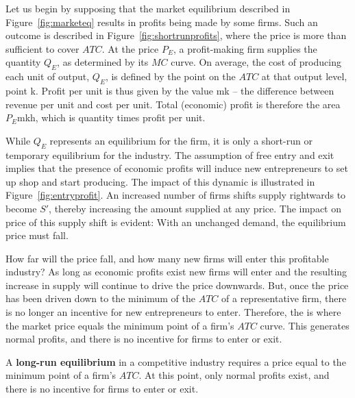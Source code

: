 Let us begin by supposing that the market equilibrium described in Figure~\ref{fig:marketeq} results in profits being made by some firms. Such an outcome is described in Figure~\ref{fig:shortrunprofits}, where the price is more than sufficient to cover $ATC$. At the price $P_E$, a profit-making firm supplies the quantity $Q_E$, as determined by its $MC$ curve. On average, the cost of producing each unit of output, $Q_E$, is defined by the point on the $ATC$ at that output level, point k. Profit per unit is thus given by the value mk -- the difference between revenue per unit and cost per unit. Total (economic) profit is therefore the area $P_E$mkh, which is quantity times profit per unit.



While $Q_E$ represents an equilibrium for the firm, it is only a short-run or temporary equilibrium for the industry. The assumption of free entry and exit implies that the presence of economic profits will induce new entrepreneurs to set up shop and start producing. The impact of this dynamic is illustrated in Figure~\ref{fig:entryprofit}. An increased number of firms shifts supply rightwards to become $S'$, thereby increasing the amount supplied at any price. The impact on price of this supply shift is evident: With an unchanged demand, the equilibrium price must fall.



How far will the price fall, and how many new firms will enter this profitable industry? As long as economic profits exist new firms will enter and the resulting increase in supply will continue to drive the price downwards. But, once the price has been driven down to the minimum of the $ATC$ of a representative firm, there is no longer an incentive for new entrepreneurs to enter. Therefore, the  is where the market price equals the minimum point of a firm's $ATC$ curve. This generates normal profits, and there is no incentive for firms to enter or exit.

\begin{DefBox}
A \textbf{long-run equilibrium} in a competitive industry requires a price equal to the minimum point of a firm's $ATC$. At this point, only normal profits exist, and there is no incentive for firms to enter or exit.
\end{DefBox}

